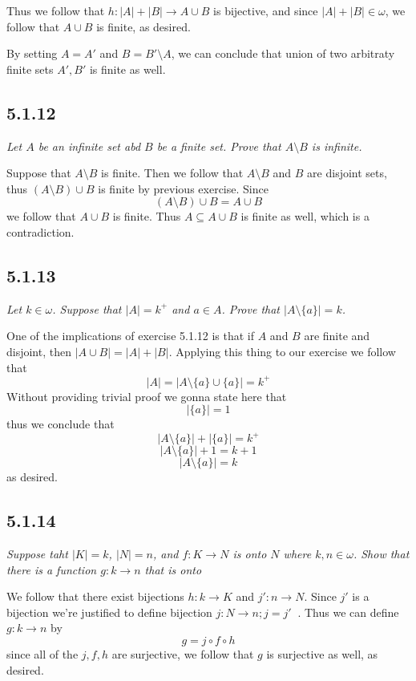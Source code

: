 \documentclass[11pt,oneside,titlepage]{book}
\DeclareMathOperator \inv {^{-1}}
\begin{document}
Thus we follow that $h: |A| + |B| \to A \cup B$ is bijective, and since $|A| + |B| \in \omega$,
we follow that $A \cup B$ is finite, as desired.

By setting $A = A'$ and $B = B' \setminus A$, we can conclude that union of two arbitraty
finite sets $A', B'$ is finite as well.

\subsection*{5.1.12 }

\textit{Let $A$ be an infinite set abd $B$ be a finite set. Prove that $A \setminus B$ is
  infinite.}

Suppose that $A \setminus B$ is finite.
Then we follow that $A \setminus B$ and $B$ are disjoint sets,
thus $(A \setminus B) \cup B$ is finite by previous exercise. Since
$$(A \setminus B) \cup B = A \cup B$$
we follow that $A \cup B$ is finite. Thus $A \subseteq A \cup B$ is finite as well, which is
a contradiction.

\subsection*{5.1.13}

\textit{Let $k \in \omega$. Suppose that $|A| = k^+$ and $a \in A$. Prove that
  $|A \setminus \{a\}| = k$.}

One of the implications of exercise 5.1.12 is that if $A$ and $B$ are finite and disjoint,
then $|A \cup B| = |A| + |B|$. Applying this thing to our exercise we follow that
$$|A| = |A \setminus \{a\} \cup \{a\}| = k^+$$
Without providing trivial proof we gonna state here that 
$$|\{a\}| = 1$$
thus we conclude that
$$|A \setminus \{a\}| + |\{a\}| = k^+$$
$$|A \setminus \{a\}| + 1 = k + 1$$
$$|A \setminus \{a\}| = k$$
as desired.

\subsection*{5.1.14}

\textit{Suppose taht $|K| = k$, $|N| = n$, and $f: K \to N$ is onto $N$ where $k, n \in \omega$.
  Show that there is a function $g: k \to n$ that is onto}

We follow that there exist bijections $h: k \to K$ and $j': n \to N$. Since $j'$ is a bijection
we're justified to define bijection $j: N \to n; j = j'\inv$. Thus we can define $g: k \to n$
by
$$g = j \circ f \circ h $$
since all of the $j, f, h$ are surjective, we follow that $g$ is surjective as well, as desired.
\end{document}
